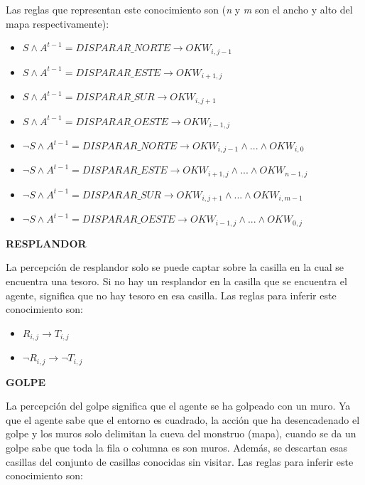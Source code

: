 Las reglas que representan este conocimiento son (\emph{n} y \emph{m} son el ancho y alto del mapa respectivamente):
\begin{itemize}
    \item $ S \land A^{t-1} = DISPARAR\_NORTE \longrightarrow OKW_{i, j-1} $
    \item $ S \land A^{t-1} = DISPARAR\_ESTE \longrightarrow OKW_{i+1, j} $
    \item $ S \land A^{t-1} = DISPARAR\_SUR \longrightarrow OKW_{i, j+1} $
    \item $ S \land A^{t-1} = DISPARAR\_OESTE \longrightarrow OKW_{i-1, j} $
\end{itemize}

\begin{itemize}
    \item $ \neg S \land A^{t-1} = DISPARAR\_NORTE \longrightarrow OKW_{i, j-1} \land ... \land OKW_{i, 0} $
    \item $ \neg S \land A^{t-1} = DISPARAR\_ESTE \longrightarrow OKW_{i+1, j} \land ... \land OKW_{n-1, j}$
    \item $ \neg S \land A^{t-1} = DISPARAR\_SUR \longrightarrow OKW_{i, j+1}  \land ... \land OKW_{i, m-1}$
    \item $ \neg S \land A^{t-1} = DISPARAR\_OESTE \longrightarrow OKW_{i-1, j} \land ... \land OKW_{0, j}$ 
\end{itemize}

\centerline{\textbf{RESPLANDOR}}

La percepción de resplandor solo se puede captar sobre la casilla en la cual se encuentra una tesoro. Si no hay un resplandor en la casilla que se encuentra el agente, significa que no hay tesoro en esa casilla. Las reglas para inferir este conocimiento son:

\begin{itemize}
    \item $R_{i, j} \longrightarrow T_{i, j}$
    \item $\neg R_{i, j} \longrightarrow \neg T_{i, j}$
\end{itemize}

\centerline{\textbf{GOLPE}}

La percepción del golpe significa que el agente se ha golpeado con un muro. Ya que el agente sabe que el entorno es cuadrado, la acción que ha desencadenado el golpe y los muros solo delimitan la cueva del monstruo (mapa), cuando se da un golpe sabe que toda la fila o columna es son muros. Además, se descartan esas casillas del conjunto de casillas conocidas sin visitar. Las reglas para inferir este conocimiento son:

